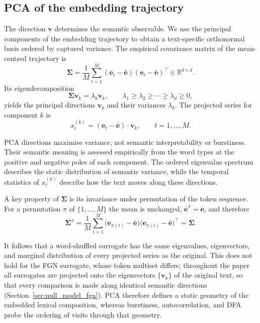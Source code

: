 \documentclass[12pt,a4paper]{article}
\newcommand{\lk}{\lambda_k}
\newcommand{\xtk}{x_t^{(k)}}
\newcommand{\vk}{\mathbf{v}_k}
\newcommand{\et}{\mathbf{e}_t}
\newcommand{\ebar}{\bar{\mathbf{e}}}
\newcommand{\Sig}{\boldsymbol{\Sigma}}
\newcommand{\R}{\mathbb{R}}
\begin{document}
\subsection{PCA of the embedding trajectory}
\label{sec:pca}

The direction $\mathbf{v}$ determines the semantic observable.
We use the principal components of the embedding trajectory to obtain a
text-specific orthonormal basis ordered by captured variance.
The empirical covariance matrix of the mean-centred trajectory is
\begin{equation}
  \Sig=
  \frac{1}{M}\sum_{t=1}^M
  (\et-\ebar)(\et-\ebar)^\top
  \in\R^{d\times d}.
  \label{eq:covariance}
\end{equation}
Its eigendecomposition
\begin{equation}
  \Sig\vk=\lk\vk,
  \qquad
  \lambda_1\geq\lambda_2\geq\cdots\geq\lambda_d\geq0,
  \label{eq:pca_eigenproblem}
\end{equation}
yields the principal directions $\vk$ and their variances $\lk$.
The projected series for component $k$ is
\begin{equation}
  \xtk=(\et-\ebar)\cdot\vk,
  \qquad t=1,\ldots,M.
  \label{eq:proj_series}
\end{equation}

PCA directions maximise variance, not semantic interpretability or
burstiness.
Their semantic meaning is assessed empirically from the word types at
the positive and negative poles of each component.
The ordered eigenvalue spectrum describes the static distribution of
semantic variance, while the temporal statistics of $\xtk$ describe how
the text moves along these directions.

A key property of $\Sig$ is its invariance under permutation of the
token sequence.
For a permutation $\pi$ of $\{1,\ldots,M\}$ the mean is unchanged,
$\ebar^{\pi}=\ebar$, and therefore
\begin{equation}
  \Sig^{\pi}
  =\frac{1}{M}\sum_{t=1}^M
  \bigl(\mathbf{e}_{\pi(t)}-\ebar\bigr)
  \bigl(\mathbf{e}_{\pi(t)}-\ebar\bigr)^\top
  =\Sig.
  \label{eq:sigma_invariant}
\end{equation}

It follows that a word-shuffled surrogate has the same eigenvalues,
eigenvectors, and marginal distribution of every projected series as
the original.
This does not hold for the FGN surrogate, whose token multiset differs;
throughout the paper all surrogates are projected onto the eigenvectors
$\{\vk\}$ of the original text, so that every comparison is made along
identical semantic directions (Section~\ref{sec:null_model_fgn}).
PCA therefore defines a static geometry of the embedded lexical
composition, whereas burstiness, autocorrelation, and DFA probe the
ordering of visits through that geometry.
\end{document}
